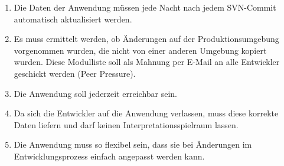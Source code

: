 \begin{enumerate}[itemsep=0em,partopsep=0em,parsep=0em,topsep=0em]
\begin{enumerate}
	\item Die Daten der Anwendung müssen jede Nacht \bzw nach jedem \acs{SVN}-Commit automatisch aktualisiert werden. 
	\item Es muss ermittelt werden, ob Änderungen auf der Produktionsumgebung vorgenommen wurden, die nicht von einer anderen Umgebung kopiert wurden. Diese Modulliste soll als Mahnung per E-Mail an alle Entwickler geschickt werden (Peer Pressure).
	\item Die Anwendung soll jederzeit erreichbar sein.
	\item Da sich die Entwickler auf die Anwendung verlassen, muss diese korrekte Daten liefern und darf keinen Interpretationsspielraum lassen.
	\item Die Anwendung muss so flexibel sein, dass sie bei Änderungen im Entwicklungsprozess einfach angepasst werden kann.
	\end{enumerate}
\end{enumerate}

